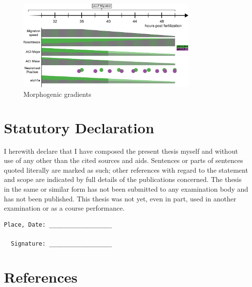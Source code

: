 \documentclass[11pt,singlespacinge,twoside]{reedthesis} %
\begin{document}
\begin{figure}

{\centering \includegraphics[width=0.8\textwidth]{figures/supp/gradients} 

}

\caption[Morphogenic gradients]{Morphogenic gradients}\label{fig:supgrad}
\end{figure}
\hypertarget{statutory-declaration}{%
\chapter*{\texorpdfstring{\textbf{Statutory Declaration}}{Statutory Declaration}}\label{statutory-declaration}}

I herewith declare that I have composed the present thesis myself and without use of any other than the
cited sources and aids. Sentences or parts of sentences quoted literally are marked as such; other references
with regard to the statement and scope are indicated by full details of the publications concerned. The thesis
in the same or similar form has not been submitted to any examination body and has not been published.
This thesis was not yet, even in part, used in another examination or as a course performance.
\begin{verbatim}
Place, Date: __________________           

  Signature: __________________
\end{verbatim}
\backmatter

\hypertarget{references}{%
\chapter*{References}\label{references}}


\noindent

\setlength{\parindent}{-0.20in}
\setlength{\leftskip}{0.20in}
\setlength{\parskip}{8pt}
\end{document}
